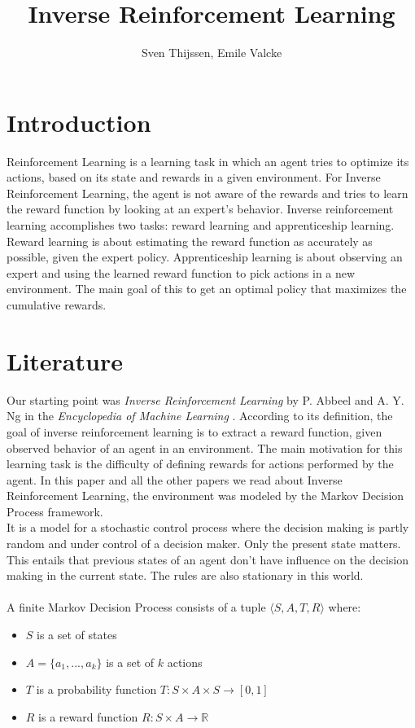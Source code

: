 \documentclass[10pt,a4paper,twocolumn]{article}
\author{Sven Thijssen, Emile Valcke}
\title{Inverse Reinforcement Learning}
\begin{document}
\maketitle

\section{Introduction}
Reinforcement Learning is a learning task in which an agent tries to optimize its actions, based on its state and rewards in a given environment. For Inverse Reinforcement Learning, the agent is not aware of the rewards and tries to learn the reward function by looking at an expert's behavior. Inverse reinforcement learning accomplishes two tasks: reward learning and apprenticeship learning. Reward learning is about estimating the reward function as accurately as possible, given the expert policy. Apprenticeship learning is about observing an expert and using the learned reward function to pick actions in a new environment. The main goal of this to get an optimal policy that maximizes the cumulative rewards.

\section{Literature}
Our starting point was \textit{Inverse Reinforcement Learning} by P. Abbeel and A. Y. Ng in the \textit{Encyclopedia of Machine Learning} \cite{sammut2011encyclopedia}. According to its definition, the goal of inverse reinforcement learning is to extract a reward function, given observed behavior of an agent in an environment. The main motivation for this learning task is the difficulty of defining rewards for actions performed by the agent. In this paper and all the other papers we read about Inverse Reinforcement Learning, the environment was modeled by the Markov Decision Process framework.\\ It is a model for a stochastic control process where the decision making is partly random and under control of a decision maker. Only the present state matters. This entails that previous states of an agent don't have influence on the decision making in the current state. The rules are also stationary in this world.\\\\

A finite Markov Decision Process consists of a tuple $\langle S,A,T,R \rangle$ where:

\begin{itemize}
\item $S$ is a set of states
\item $A = \{a_1,...,a_k\}$ is a set of $k$ actions
\item $T$ is a probability function $T: S \times A \times S \to [0,1]$
\item $R$ is a reward function $R: S \times A \to \mathbb{R}$
\end{itemize}
\end{document}
